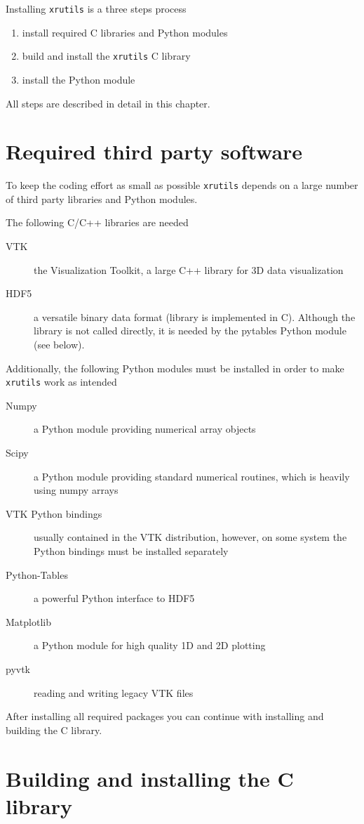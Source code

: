 
Installing {\tt xrutils} is a three steps process
\begin{enumerate}
\item install required C libraries and Python modules
\item build and install the {\tt xrutils} C library
\item install the Python module
\end{enumerate}
All steps are described in detail in this chapter.

\section{Required third party software}
To keep the coding effort as small as possible {\tt xrutils} depends on a 
large number of third party libraries and Python modules. 

The following C/C++ libraries are needed 
\begin{description}
\item[VTK] the Visualization Toolkit, a large C++ library for 3D data
visualization
\item[HDF5] a versatile binary data format (library is implemented in C).
Although the library is not called directly, it is needed by the pytables Python
module (see below).
\end{description}

Additionally, the following Python modules must be installed in order to make 
{\tt xrutils} work as intended
\begin{description}
\item[Numpy] a Python module providing numerical array objects
\item[Scipy] a Python module providing standard numerical routines, which is heavily using numpy arrays
\item[VTK Python bindings] usually contained in the VTK distribution, however,
on some system the Python bindings must be installed separately 
\item[Python-Tables] a powerful Python interface to HDF5
\item[Matplotlib] a Python module for high quality 1D and 2D plotting
\item[pyvtk] reading and writing legacy VTK files
\end{description}
After installing all required packages you can continue with installing and
building the C library.

\section{Building and installing the C library}

